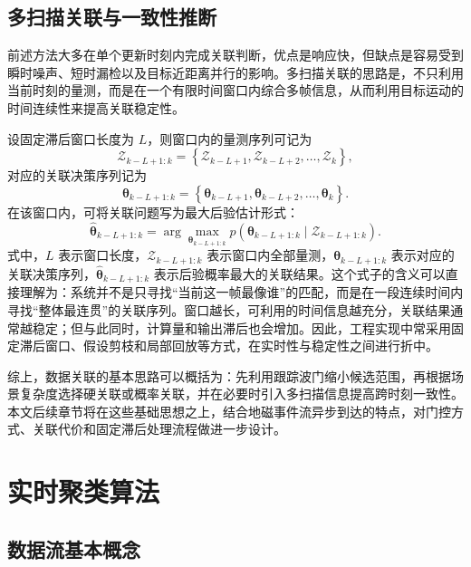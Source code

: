 \documentclass{xdupgthesis}
\begin{document}
\subsection{多扫描关联与一致性推断}

前述方法大多在单个更新时刻内完成关联判断，优点是响应快，但缺点是容易受到瞬时噪声、短时漏检以及目标近距离并行的影响。多扫描关联的思路是，不只利用当前时刻的量测，而是在一个有限时间窗口内综合多帧信息，从而利用目标运动的时间连续性来提高关联稳定性\cite{reid1979mht}。

设固定滞后窗口长度为 $L$，则窗口内的量测序列可记为
\begin{equation}
	\mathcal{Z}_{k-L+1:k}
	=
	\left\{
	\mathcal{Z}_{k-L+1},\mathcal{Z}_{k-L+2},\ldots,\mathcal{Z}_k
	\right\},
\end{equation}
对应的关联决策序列记为
\begin{equation}
	\boldsymbol{\theta}_{k-L+1:k}
	=
	\left\{
	\boldsymbol{\theta}_{k-L+1},\boldsymbol{\theta}_{k-L+2},\ldots,\boldsymbol{\theta}_k
	\right\}.
\end{equation}
在该窗口内，可将关联问题写为最大后验估计形式：
\begin{equation}
	\hat{\boldsymbol{\theta}}_{k-L+1:k}
	=
	\arg\max_{\boldsymbol{\theta}_{k-L+1:k}}
	p\!\left(
	\boldsymbol{\theta}_{k-L+1:k}
	\mid
	\mathcal{Z}_{k-L+1:k}
	\right).
\end{equation}
式中，$L$ 表示窗口长度，$\mathcal{Z}_{k-L+1:k}$ 表示窗口内全部量测，$\boldsymbol{\theta}_{k-L+1:k}$ 表示对应的关联决策序列，$\hat{\boldsymbol{\theta}}_{k-L+1:k}$ 表示后验概率最大的关联结果。这个式子的含义可以直接理解为：系统并不是只寻找“当前这一帧最像谁”的匹配，而是在一段连续时间内寻找“整体最连贯”的关联序列。窗口越长，可利用的时间信息越充分，关联结果通常越稳定；但与此同时，计算量和输出滞后也会增加。因此，工程实现中常采用固定滞后窗口、假设剪枝和局部回放等方式，在实时性与稳定性之间进行折中。

综上，数据关联的基本思路可以概括为：先利用跟踪波门缩小候选范围，再根据场景复杂度选择硬关联或概率关联，并在必要时引入多扫描信息提高跨时刻一致性。本文后续章节将在这些基础思想之上，结合地磁事件流异步到达的特点，对门控方式、关联代价和固定滞后处理流程做进一步设计。


\section{实时聚类算法}

\subsection{数据流基本概念}
\end{document}
